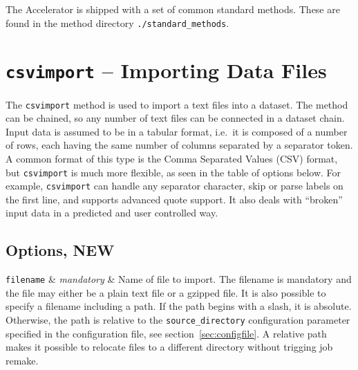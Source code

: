 
The Accelerator is shipped with a set of common standard methods.
These are found in the method directory \texttt{./standard\_methods}.

\section{\texttt{csvimport} -- Importing Data Files}

The \texttt{csvimport} method is used to import a text files into a
dataset.  The method can be chained, so any number of text files can
be connected in a dataset chain.  Input data is assumed to be in a
tabular format, i.e.\ it is composed of a number of rows, each having
the same number of columns separated by a separator token.  A common
format of this type is the Comma Separated Values (CSV) format, but
\texttt{csvimport} is much more flexible, as seen in the table of
options below.  For example, \texttt{csvimport} can handle any
separator character, skip or parse labels on the first line, and
supports advanced quote support.  It also deals with ``broken'' input
data in a predicted and user controlled way.


\subsection{Options, NEW}
\starttable
  \RP \texttt{filename} & \emph{mandatory} & Name of file to import.  The
  filename is mandatory and the file may either be a plain text file
  or a gzipped file.  It is also possible to specify a filename
  including a path.  If the path begins with a slash, it is absolute.
  Otherwise, the path is relative to the \texttt{source\_directory}
  configuration parameter specified in the configuration
  file, see section~\ref{sec:configfile}.  A relative path makes it
  possible to relocate files to a different directory without trigging
  job remake.\\[1ex]

